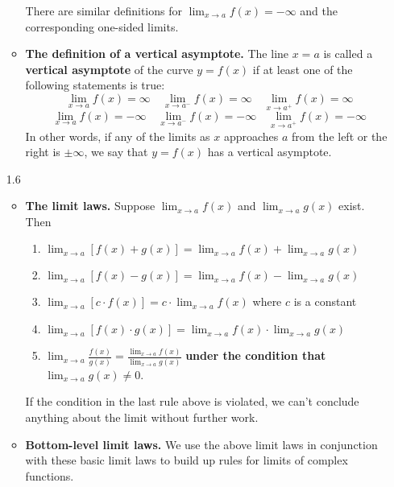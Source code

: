 \documentclass{article}
\newcommand{\ds}{\displaystyle}
\begin{document}
\begin{itemize}
\begin{itemize}
    There are similar definitions for $\ds\lim_{x\to a} f(x)=-\infty$
    and the corresponding one-sided limits.
  \item \textbf{The definition of a vertical asymptote.}
    The line $x=a$ is called a \textbf{vertical asymptote} of the curve
    $y=f(x)$ if at least one of the following statements is true:
    \begin{displaymath}
      \lim_{x\to a} f(x) = \infty
      \quad
      \lim_{x\to a^-} f(x) = \infty
      \quad
      \lim_{x\to a^+} f(x) = \infty
    \end{displaymath}
    \begin{displaymath}
      \lim_{x\to a} f(x) = -\infty
      \quad
      \lim_{x\to a^-} f(x) = -\infty
      \quad
      \lim_{x\to a^+} f(x) = -\infty
    \end{displaymath}
    In other words, if any of the limits as $x$ approaches $a$ from the left
    or the right is $\pm\infty$, we say that $y=f(x)$ has a vertical asymptote.
  \end{itemize}
\item[1.6]
  \begin{itemize}
  \item \textbf{The limit laws.} Suppose
    $\ds\lim_{x\to a} f(x)$ and $\ds\lim_{x\to a} g(x)$ exist.  Then
    \begin{enumerate}
    \item $\ds\lim_{x\to a} [f(x)+g(x)] 
      = \lim_{x\to a} f(x) + \lim_{x\to a} g(x)$
    \item $\ds\lim_{x\to a} [f(x)-g(x)] 
      = \lim_{x\to a} f(x) - \lim_{x\to a} g(x)$
    \item $\ds\lim_{x\to a} [c \cdot f(x)] = c\cdot \lim_{x\to a} f(x)$
      where $c$ is a constant
    \item $\ds\lim_{x\to a} [f(x)\cdot g(x)] = \lim_{x\to a} f(x) \cdot
      \lim_{x\to a} g(x)$
    \item $\ds\lim_{x\to a} \frac{f(x)}{g(x)}
      = \frac{\ds\lim_{x\to a} f(x)}{\ds\lim_{x\to a} g(x)}$
      \textbf{under the condition that} $\ds\lim_{x\to a} g(x)\ne 0$.
    \end{enumerate}
    If the condition in the last rule above is violated, we can't conclude
    anything about the limit without further work.
  \item \textbf{Bottom-level limit laws.} We use the above limit laws in
    conjunction with these basic limit laws to build up rules for limits
    of complex functions.
    \begin{enumerate}

\end{enumerate}
\end{itemize}
\end{itemize}
\end{document}
